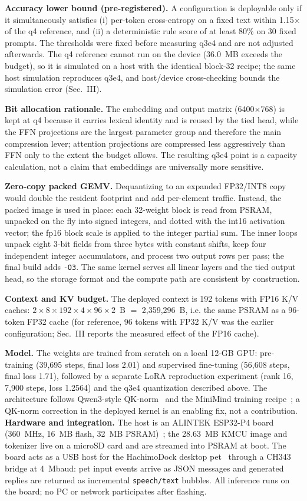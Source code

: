 \documentclass[journal,letterpaper]{IEEEtran}
\begin{document}
\textbf{Accuracy lower bound (pre-registered).} A configuration is deployable only if it
simultaneously satisfies (i) per-token cross-entropy on a fixed text within 1.15$\times$ of the
q4 reference, and (ii) a deterministic rule score of at least 80\% on 30 fixed prompts. The
thresholds were fixed before measuring q3e4 and are not adjusted afterwards. The q4 reference
cannot run on the device (36.0~MB exceeds the budget), so it is simulated on a host with the
identical block-32 recipe; the same host simulation reproduces q3e4, and host/device
cross-checking bounds the simulation error (Sec.~III).

\textbf{Bit allocation rationale.} The embedding and output matrix (6400$\times$768) is kept at
q4 because it carries lexical identity and is reused by the tied head, while the FFN projections
are the largest parameter group and therefore the main compression lever; attention projections
are compressed less aggressively than FFN only to the extent the budget allows. The resulting
q3e4 point is a capacity calculation, not a claim that embeddings are universally more
sensitive.

\textbf{Zero-copy packed GEMV.} Dequantizing to an expanded FP32/INT8 copy would double the
resident footprint and add per-element traffic. Instead, the packed image is used in place:
each 32-weight block is read from PSRAM, unpacked on the fly into signed integers, and dotted
with the int16 activation vector; the fp16 block scale is applied to the integer partial sum.
The inner loops unpack eight 3-bit fields from three bytes with constant shifts, keep four
independent integer accumulators, and process two output rows per pass; the final build adds
\texttt{-O3}. The same kernel serves all linear layers and the tied output head, so the storage
format and the compute path are consistent by construction.

\textbf{Context and KV budget.} The deployed context is 192 tokens with FP16 K/V caches:
$2 \times 8 \times 192 \times 4 \times 96 \times 2$~B $=$ 2,359,296~B, i.e. the same PSRAM as a
96-token FP32 cache (for reference, 96 tokens with FP32 K/V was the earlier configuration;
Sec.~III reports the measured effect of the FP16 cache).

\textbf{Model.} The weights are trained from scratch on a local 12-GB GPU: pre-training
(39,695 steps, final loss 2.01) and supervised fine-tuning (56,608 steps, final loss 1.71),
followed by a separate LoRA reproduction experiment (rank 16, 7,900 steps, loss 1.2564) and
the q3e4 quantization described above. The architecture follows Qwen3-style QK-norm~\cite{qwen3} and the MiniMind training recipe~\cite{minimind}; a QK-norm correction in the deployed kernel is an
enabling fix, not a contribution.
\textbf{Hardware and integration.} The host is an ALINTEK ESP32-P4 board (360~MHz, 16~MB flash,
32~MB PSRAM)~\cite{psram}; the 28.63~MB KMCU image and tokenizer live on a microSD card and are
streamed into PSRAM at boot. The board acts as a USB host for the HachimoDock desktop
pet~\cite{hachimodock} through a CH343 bridge at 4~Mbaud: pet input events arrive as JSON
messages and generated replies are returned as incremental \texttt{speech/text} bubbles. All
inference runs on the board; no PC or network participates after flashing.
\end{document}
